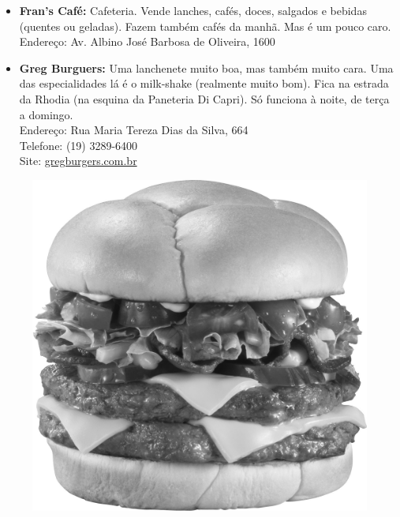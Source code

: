 \begin{itemize}
\item   \textbf{Fran's Café:} Cafeteria. Vende lanches, cafés, doces, salgados e
        bebidas (quentes ou geladas). Fazem também cafés da manhã. Mas é um
        pouco caro.
        \\Endereço: Av. Albino José Barbosa de Oliveira, 1600

\item   \textbf{Greg Burguers:} Uma lanchenete muito boa, mas também muito cara.
        Uma das especialidades lá é o milk-shake (realmente muito bom). Fica na
        estrada da Rhodia (na esquina da Paneteria Di Capri). Só funciona à
        noite, de terça a domingo.
        \\Endereço: Rua Maria Tereza Dias da Silva, 664
        \\Telefone: (19) 3289-6400
        \\Site: \url{gregburgers.com.br}
\end{itemize}
\begin{figure}[h!]
    \centering
    \includegraphics[scale=0.48,keepaspectratio=true]{img/imgs/6-comida/burger.jpg}
\end{figure}


